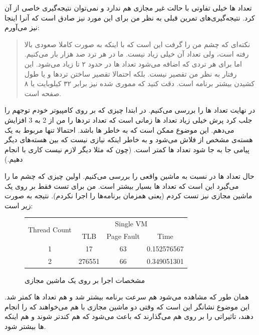 تعداد
ها
خیلی تفاوتی با حالت غیر مجازی هم ندارد و نمی‌توان نتیجه‌گیری خاصی از آن کرد. نتیجه‌گیری‌های تمرین قبلی
به نظر من برای این مورد نیز صادق است که آنرا اینجا نیز می‌آورم:
\begin{quote}
    نکته‌ای که چشم من را گرفت این است که
    با اینکه به صورت کاملا صعودی بالا رفته است،‌ ولی تعداد آن خیلی زیاد نیست. ما در هر ترد صد هزار بار
    می‌کنیم. اما برای هر تردی که اضافه می‌شود تعداد 
    ها
    در حدود ۲ تا زیاد می‌شود. این رفتار به نظر من تقصیر
    نیست. بلکه احتمالا تقصیر ساختن ترد‌ها و یا طول کشیدن بیشتر برنامه است. دقت کنید که مموری
    شده نیز برابر
    ۳۲ کیلوبایت یا
    ۸ صفحه است.
\end{quote}

در نهایت تعداد
ها
را بررسی می‌کنیم. در ابتدا چیزی که بر روی کامپیوتر خودم توجهم را جلب کرد پرش خیلی زیاد تعداد
ها
زمانی است که تعداد ترد‌ها را من از 2 به 3 افزایش می‌دهم. این موضوع ممکن است که به خاطر
ها
باشد. احتمالا تنها
مربوط به یک هسته‌ی مشخص از
فلاش می‌شود و به خاطر اینکه نیازی نیست که بین هسته‌های دیگر پیامی جا به جا شود تعداد
ها
کمتر است. (چون که مثلا دیگر لازم نیست کاری با  انجام دهیم.)

حال تعداد
ها
در
نسبت به ماشین واقعی را بررسی می‌کنیم. اولین چیزی که چشم ما را می‌گیرد این است که تعداد
ها
بسیار بیشتر است. من برای تست فقط بر روی یک ماشین مجازی نیز تست کردم (یعنی همزمان برنامه‌ها را اجرا نکردم).
نتیجه به صورت زیر است:
\begin{figure}[H]
    \small
    \centering
    \begin{latin}
    \begin{tabular}{|c|ccc|}
        \hline
        \multirow{2}{*}{Thread Count} & \multicolumn{3}{|c|}{Single VM}\\
        & TLB & Page Fault & Time\\
        \hline
        1 & 17&63&0.152576567\\
        2 & 276551&66&0.349051301\\
        \hline
    \end{tabular}
    \end{latin}
    \caption{مشخصات اجرا بر روی یک ماشین مجازی}
\end{figure}
همان طور که مشاهده می‌شود هم سرعت برنامه بیشتر شد و هم تعداد
ها
کمتر شد. این موضوع نشانگر این است که وقتی دو ماشین مجازی با هم می‌خواهند که
را انجام دهند،‌ تاثیراتی را بر روی هم می‌گذارند که باعث می‌شود که هم کندتر شوند و هم اینکه
ها
بیشتر شود.